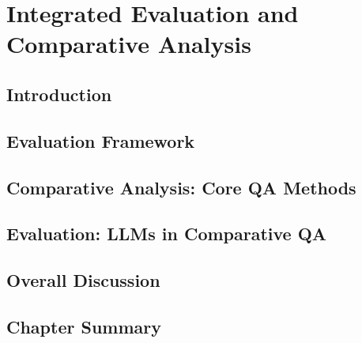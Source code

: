 \chapter{Integrated Evaluation and Comparative Analysis}
\label{ch:evaluation}

\section{Introduction}
\label{sec:evaluation:intro}

\section{Evaluation Framework}
\label{sec:evaluation:framework}

\section{Comparative Analysis: Core QA Methods}
\label{sec:evaluation:core_methods}

\section{Evaluation: LLMs in Comparative QA}
\label{sec:evaluation:comparative_qa}

\section{Overall Discussion}
\label{sec:evaluation:discussion}

\section{Chapter Summary}
\label{sec:evaluation:summary}
